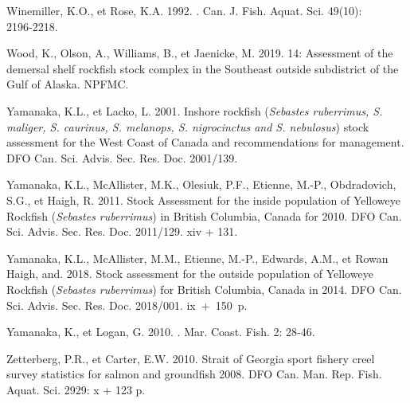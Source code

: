 \documentclass[french,11pt]{book}
\begin{document}
\begin{CSLReferences}{1}{0}
%
Winemiller, K.O., et Rose, K.A. 1992. . Can. J. Fish. Aquat. Sci. 49(10): 2196‑2218.

%
Wood, K., Olson, A., Williams, B., et Jaenicke, M. 2019. 14: Assessment of the demersal shelf rockfish stock complex in the Southeast outside subdistrict of the Gulf of Alaska. {NPFMC}.

%
Yamanaka, K.L., et Lacko, L. 2001. Inshore rockfish ({\emph{Sebastes ruberrimus, S. maliger, S. caurinus, S. melanops, S. nigrocinctus and S. nebulosus}}) stock assessment for the West Coast of {Canada} and recommendations for management. DFO Can. Sci. Advis. Sec. Res. Doc. 2001/139.

%
Yamanaka, K.L., McAllister, M.K., Olesiuk, P.F., Etienne, M.-P., Obdradovich, S.G., et Haigh, R. 2011. Stock Assessment for the inside population of {Yelloweye} {Rockfish} {(\emph{Sebastes ruberrimus})} in {British Columbia}, {Canada} for 2010. DFO Can. Sci. Advis. Sec. Res. Doc. 2011/129. xiv + 131.

%
Yamanaka, K.L., McAllister, M.M., Etienne, M.-P., Edwards, A.M., et Rowan Haigh, and. 2018. Stock assessment for the outside population of {Yelloweye Rockfish} ({\emph{Sebastes ruberrimus}}) for {British Columbia, Canada} in 2014. DFO Can. Sci. Advis. Sec. Res. Doc. 2018/001. ix~+~150~p.

%
Yamanaka, K., et Logan, G. 2010. . Mar. Coast. Fish. 2: 28‑46.

%
Zetterberg, P.R., et Carter, E.W. 2010. {Strait} of {Georgia} sport fishery creel survey statistics for salmon and groundfish 2008. DFO Can. Man. Rep. Fish. Aquat. Sci. 2929: x + 123 p.

\end{CSLReferences}
\setlength{\parindent}{0in} \setlength{\leftskip}{0in} \setlength{\parskip}{4pt}

\clearpage

\Appendices


\clearpage
\end{document}
